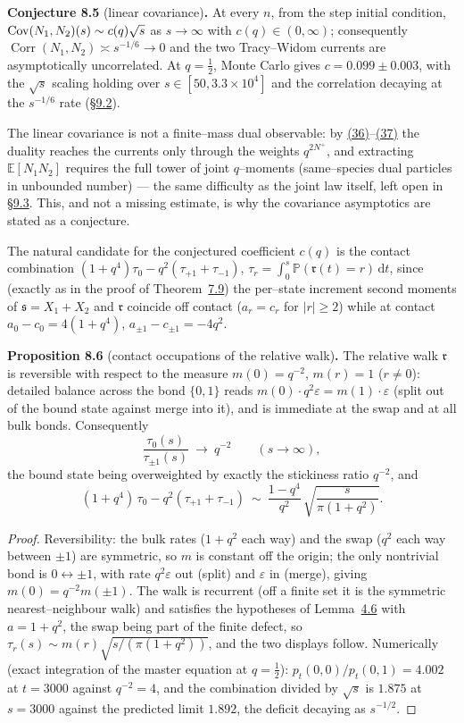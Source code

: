 \documentclass[11pt]{article}
\theoremstyle{plain}
\theoremstyle{definition}
\theoremstyle{remark}
\DeclareMathOperator{\Corr}{Corr}\DeclareMathOperator{\cum}{cum}
\newcommand{\E}{\mathbb{E}}\newcommand{\PP}{\mathbb{P}}\newcommand{\dd}{\,\mathrm{d}}
\newcommand{\eps}{\varepsilon}\newcommand{\Exp}{\mathrm{Exp}}
\begin{document}
\label{conj_cov}\noindent\textbf{Conjecture 8.5} (linear covariance)\textbf{.} 
At every $n$, from the step initial condition,
$\operatorname{Cov}(N_1,N_2)(s)\sim c(q)\sqrt s$ as $s\to\infty$ with $c(q)\in(0,\infty)$;
consequently $\Corr(N_1,N_2)\asymp s^{-1/6}\to0$ and the two Tracy--Widom currents
are asymptotically uncorrelated. At $q=\tfrac12$, Monte Carlo gives
$c=0.099\pm0.003$, with the $\sqrt s$ scaling holding over
$s\in[50,3.3\times10^4]$ and the correlation decaying at the $s^{-1/6}$ rate
(\S\hyperref[sec_numerics]{9.2}).
\par

The linear covariance is not a finite--mass dual observable: by
\hyperref[eq_tri1]{(36)}--\hyperref[eq_tri2]{(37)} the duality reaches the currents only through the
weights $q^{2N^+}$, and extracting $\E[N_1N_2]$ requires the full tower of joint
$q$--moments (same--species dual particles in unbounded number) --- the same
difficulty as the joint law itself, left open in \S\hyperref[sec_disc]{9.3}. This, and not a
missing estimate, is why the covariance asymptotics are stated as a conjecture.

The natural candidate for the conjectured coefficient $c(q)$ is the contact
combination
$(1+q^4)\tau_0-q^2(\tau_{+1}+\tau_{-1})$, $\tau_r=\int_0^s\PP(\mathfrak r(t)=r)\dd t$,
since (exactly as in the proof of Theorem~\hyperref[thm_closed]{7.9}) the per--state increment
second moments of $\mathfrak s=X_1+X_2$ and $\mathfrak r$ coincide off contact
($a_r=c_r$ for $|r|\ge2$) while at contact $a_0-c_0=4(1+q^4)$,
$a_{\pm1}-c_{\pm1}=-4q^2$. 

\label{prop_occ}\noindent\textbf{Proposition 8.6} (contact occupations of the relative walk)\textbf{.} 
The relative walk $\mathfrak r$ is reversible with respect to the measure
$m(0)=q^{-2}$, $m(r)=1$ \textup($r\ne0$\textup): detailed balance across the bond
$\{0,1\}$ reads $m(0)\cdot q^2\eps=m(1)\cdot\eps$ \textup(split out of the bound state
against merge into it\textup), and is immediate at the swap and at all bulk bonds.
Consequently
\[
  \frac{\tau_0(s)}{\tau_{\pm1}(s)}\ \longrightarrow\ q^{-2}\qquad(s\to\infty),
\]
the bound state being overweighted by exactly the stickiness ratio $q^{-2}$, and
\[
  (1+q^4)\,\tau_0-q^2(\tau_{+1}+\tau_{-1})\ \sim\
  \frac{1-q^4}{q^{2}}\,\sqrt{\frac{s}{\pi(1+q^2)}}.
\]
\par
\begin{proof}
Reversibility: the bulk rates ($1+q^2$ each way) and the swap ($q^2$ each way between
$\pm1$) are symmetric, so $m$ is constant off the origin; the only nontrivial bond is
$0\leftrightarrow\pm1$, with rate $q^2\eps$ out (split) and $\eps$ in (merge), giving
$m(0)=q^{-2}m(\pm1)$. The walk is recurrent (off a finite set it is the symmetric
nearest--neighbour walk) and satisfies the hypotheses of Lemma~\hyperref[lem_tau]{4.6} with
$a=1+q^2$, the swap being part of the finite defect, so
$\tau_r(s)\sim m(r)\sqrt{s/(\pi(1+q^2))}$, and the two displays follow.
Numerically (exact integration of the master equation at $q=\tfrac12$):
$p_t(0,0)/p_t(0,1)=4.002$ at $t=3000$ against $q^{-2}=4$, and the combination divided
by $\sqrt s$ is $1.875$ at $s=3000$ against the predicted limit $1.892$, the deficit
decaying as $s^{-1/2}$.
\end{proof}
\end{document}
